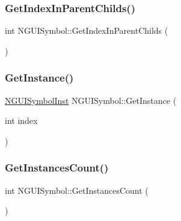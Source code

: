 \hypertarget{class_n_g_u_i_symbol_ab7f67787ab5da2534a59cc057296e972}{}\label{class_n_g_u_i_symbol_ab7f67787ab5da2534a59cc057296e972} 
\subsubsection{\texorpdfstring{Get\+Index\+In\+Parent\+Childs()}{GetIndexInParentChilds()}}
{\footnotesize\ttfamily int N\+G\+U\+I\+Symbol\+::\+Get\+Index\+In\+Parent\+Childs (\begin{DoxyParamCaption}{ }\end{DoxyParamCaption})}

\hypertarget{class_n_g_u_i_symbol_aee167aa5bfd5d81fc5c345570cc757f6}{}\label{class_n_g_u_i_symbol_aee167aa5bfd5d81fc5c345570cc757f6} 
\subsubsection{\texorpdfstring{Get\+Instance()}{GetInstance()}}
{\footnotesize\ttfamily \hyperlink{class_n_g_u_i_symbol_inst}{N\+G\+U\+I\+Symbol\+Inst} N\+G\+U\+I\+Symbol\+::\+Get\+Instance (\begin{DoxyParamCaption}\item[{int}]{index }\end{DoxyParamCaption})}

\hypertarget{class_n_g_u_i_symbol_a3d87395cd3550e89ed1a6747aea20934}{}\label{class_n_g_u_i_symbol_a3d87395cd3550e89ed1a6747aea20934} 
\subsubsection{\texorpdfstring{Get\+Instances\+Count()}{GetInstancesCount()}}
{\footnotesize\ttfamily int N\+G\+U\+I\+Symbol\+::\+Get\+Instances\+Count (\begin{DoxyParamCaption}{ }\end{DoxyParamCaption})}

\hypertarget{class_n_g_u_i_symbol_afbf6a33668eed48bdef1e74aac23d95f}{}\label{class_n_g_u_i_symbol_afbf6a33668eed48bdef1e74aac23d95f} 
